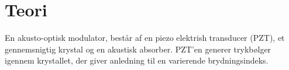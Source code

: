 \documentclass[main]{subfiles}
\begin{document}
\section{Teori}
En akusto-optisk modulator, består af en piezo elektrish transducer (PZT), et gennemsnigtig krystal og en akustisk absorber. PZT'en generer trykbølger igennem krystallet, der giver anledning til en varierende brydningsindeks. 
\end{document}
